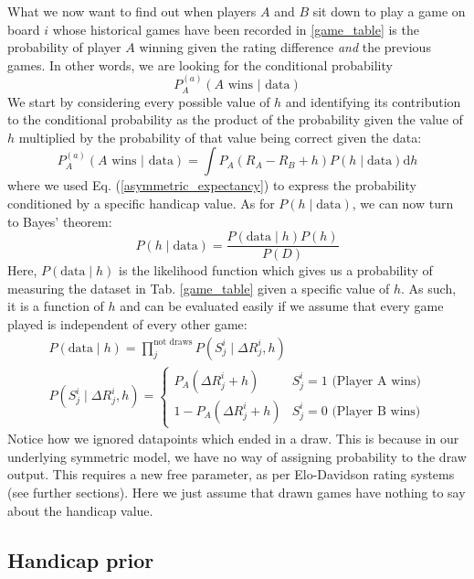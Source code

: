 \documentclass[12pt]{article}
\begin{document}
	What we now want to find out when players $A$ and $B$ sit down to play a game on board $i$ whose historical games have been recorded in \ref{game_table} is the probability of player $A$ winning given the rating difference \textit{and} the previous games. In other words, we are looking for the conditional probability
	$$P^{(a)}_A(A\text{ wins } | \text{ data})$$
	We start by considering every possible value of $h$ and identifying its contribution to the conditional probability as the product of the probability given the value of $h$ multiplied by the probability of that value being correct given the data:
	\begin{equation} \label{prob_convolution}
	P^{(a)}_A(A\text{ wins } | \text{ data}) = \int P_A(R_A - R_B + h) P(h\mid\text{data}) \text{d}h
	\end{equation}
	where we used Eq. (\ref{asymmetric_expectancy}) to express the probability conditioned by a specific handicap value. As for $P(h\mid\text{data})$, we can now turn to Bayes' theorem:
	\begin{equation} \label{bayes}
	P(h\mid\text{data}) = \frac{P(\text{data}\mid h)P(h)}{P(D)}
	\end{equation}
	Here, $P(\text{data}\mid h)$ is the likelihood function which gives us a probability of measuring the dataset in Tab. \ref{game_table} given a specific value of $h$. As such, it is a function of $h$ and can be evaluated easily if we assume that every game played is independent of every other game:
	\begin{eqnarray} \label{handicap_likelihood}
	P(\text{data}\mid h) = \prod_j^{\text{not draws}} P(S^i_j\mid\Delta R^i_j, h)\\
	P(S^i_j\mid\Delta R^i_j, h)=\begin{cases} 
      P_A(\Delta R^i_j + h) & S^i_j = 1\text{ (Player A wins)} \\
      1 - P_A(\Delta R^i_j + h) & S^i_j = 0\text{ (Player B wins)}
   \end{cases}
	\end{eqnarray}
	Notice how we ignored datapoints which ended in a draw. This is because in our underlying symmetric model, we have no way of assigning probability to the draw output. This requires a new free parameter, as per Elo-Davidson rating systems (see further sections). Here we just assume that drawn games have nothing to say about the handicap value.
	
	\subsection{Handicap prior}
	
\end{document}

